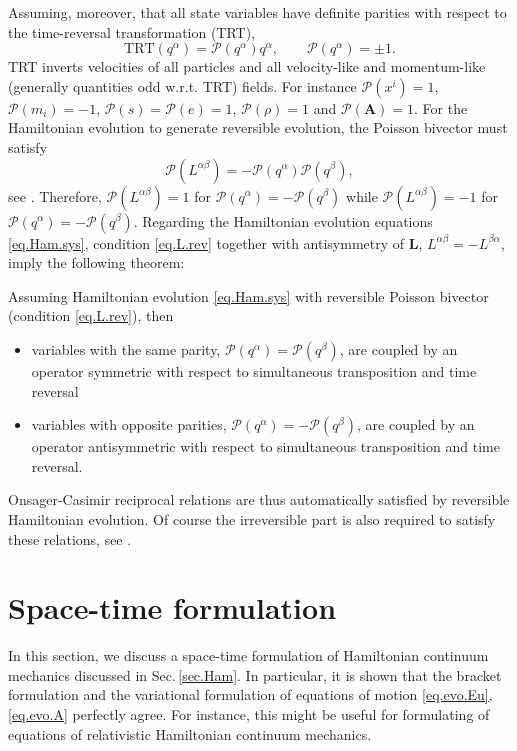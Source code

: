 \documentclass[
10pt, %
a4paper, %
oneside, %
headinclude,footinclude, %
BCOR5mm, %
]{scrartcl}
\renewcommand{\AA}{\mathbf{A}}
\newcommand{\LL}{\mathbf{L}}
\newcommand{\TRT}{\mathrm{TRT}}
\newcommand{\Par}{\mathcal{P}}
\begin{document}
Assuming, moreover, that all state variables have definite parities with respect to the 
time-reversal transformation (TRT), 
\begin{equation}
\TRT(q^\alpha) = \Par(q^\alpha) q^\alpha, \qquad \Par(q^\alpha) = \pm 1.
\end{equation}
TRT inverts velocities of all particles and all velocity-like and momentum-like (generally quantities odd w.r.t. TRT) fields. For instance $\Par(x^i) = 1$, $\Par(m_i) = -1$, $\Par(s)=\Par(e)=1$, $\Par(\rho)=1$ and $\Par(\AA)=1$. For the Hamiltonian evolution to generate reversible evolution, the Poisson bivector must satisfy
\begin{equation}\label{eq.L.rev}
    \Par(L^{\alpha\beta}) = -\Par(q^\alpha)\Par(q^\beta),
\end{equation}
see \cite{PRE15}. Therefore, $\Par(L^{\alpha\beta})=1$ for $\Par(q^\alpha)=-\Par(q^\beta)$ while $\Par(L^{\alpha\beta})=-1$ for $\Par(q^\alpha)=-\Par(q^\beta)$.
Regarding the Hamiltonian evolution equations \eqref{eq.Ham.sys}, condition \eqref{eq.L.rev} 
together with antisymmetry of $\LL$, $L^{\alpha\beta}=-L^{\beta\alpha}$, imply the following theorem:
\begin{theorem}
Assuming Hamiltonian evolution \eqref{eq.Ham.sys} with reversible Poisson bivector (condition \eqref{eq.L.rev}), then 
\begin{itemize}
    \item variables with the same parity, $\Par(q^\alpha)=\Par(q^\beta)$, are coupled by an operator symmetric with respect to simultaneous transposition and time reversal
    \item variables with opposite parities, $\Par(q^\alpha)=-\Par(q^\beta)$, are coupled by an operator antisymmetric with respect to simultaneous transposition and time reversal.
\end{itemize}
\end{theorem}
Onsager-Casimir reciprocal relations are thus automatically satisfied by reversible Hamiltonian evolution. Of course the irreversible part is also required to satisfy these relations, see \cite{HCO, PKG}. 

\section{Space-time formulation}\label{sec.Lagr.mech}


In this section, we discuss a space-time formulation of Hamiltonian continuum mechanics discussed 
in Sec.\,\ref{sec.Ham}. In particular, it is shown that the bracket formulation and the variational 
formulation of equations of motion \eqref{eq.evo.Eu}, \eqref{eq.evo.A} perfectly agree.  For 
instance, this might be useful for formulating of equations of relativistic 
Hamiltonian continuum mechanics. 
\end{document}
